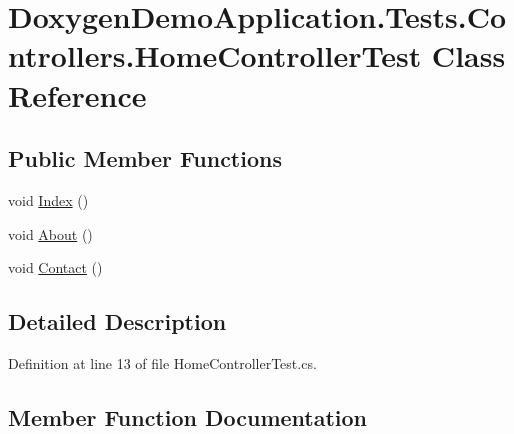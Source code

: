 \hypertarget{class_doxygen_demo_application_1_1_tests_1_1_controllers_1_1_home_controller_test}{}\section{Doxygen\+Demo\+Application.\+Tests.\+Controllers.\+Home\+Controller\+Test Class Reference}
\label{class_doxygen_demo_application_1_1_tests_1_1_controllers_1_1_home_controller_test}
\subsection*{Public Member Functions}
\begin{DoxyCompactItemize}
\item 
void \mbox{\hyperlink{class_doxygen_demo_application_1_1_tests_1_1_controllers_1_1_home_controller_test_a37676ede72810604e3c30e1e5f126ee0}{Index}} ()
\item 
void \mbox{\hyperlink{class_doxygen_demo_application_1_1_tests_1_1_controllers_1_1_home_controller_test_a49e01d0f8582dc219e914dfe71b05a6c}{About}} ()
\item 
void \mbox{\hyperlink{class_doxygen_demo_application_1_1_tests_1_1_controllers_1_1_home_controller_test_af473f3a9c2ca9da46ef0d4c8a4012238}{Contact}} ()
\end{DoxyCompactItemize}


\subsection{Detailed Description}


Definition at line 13 of file Home\+Controller\+Test.\+cs.



\subsection{Member Function Documentation}
\mbox{\label{class_doxygen_demo_application_1_1_tests_1_1_controllers_1_1_home_controller_test_a49e01d0f8582dc219e914dfe71b05a6c}} 
